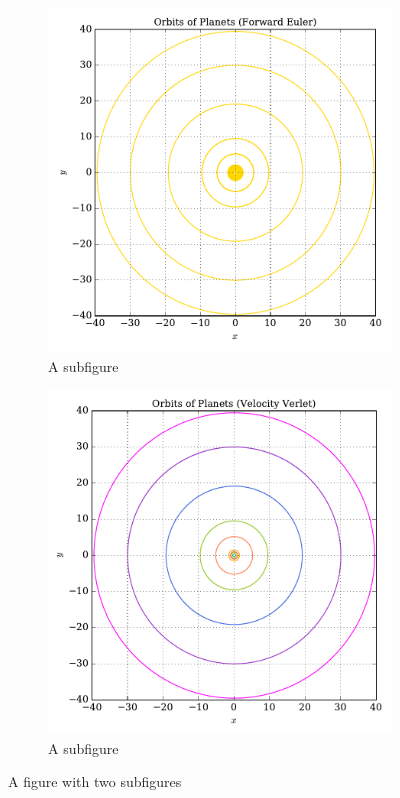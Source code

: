 \documentclass[prb,aps,twocolumn,showpacs,10pt]{revtex4-1}
\begin{document}
\begin{figure}
\centering
\begin{subfigure}{.5\textwidth}
  \centering
  \includegraphics[width=\linewidth]{solar_system_euler_orbit.pdf}
  \caption{A subfigure}
  \label{fig:sub1}
\end{subfigure}%
\begin{subfigure}{.5\textwidth}
  \centering
  \includegraphics[width=\linewidth]{solar_system_vv_orbit.pdf}
  \caption{A subfigure}
  \label{fig:sub2}
\end{subfigure}
\caption{A figure with two subfigures}
\label{fig:test}
\end{figure}
\end{document}
